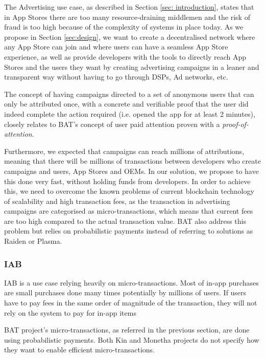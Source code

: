 The Advertising use case, as described in Section \ref{sec: introduction}, states that in App Stores there are too many resource-draining middlemen and the risk of fraud is too high because of the complexity of systems in place today. As we propose in Section \ref{sec:design}, we want to create a decentralised network where any App Store can join and where users can have a seamless App Store experience, as well as provide developers with the tools to directly reach App Stores and the users they want by creating advertising campaigns in a leaner and transparent way without having to go through DSPs, Ad networks, etc.

The concept of having campaigns directed to a set of anonymous users that can only be attributed once, with a concrete and verifiable proof that the user did indeed complete the action required (i.e. opened the app for at least 2 minutes), closely relates to BAT's concept of user paid attention proven with a \textit{proof-of-attention}.

Furthermore, we expected that campaigns can reach millions of attributions, meaning that there will be millions of transactions between developers who create campaigns and users, App Stores and OEMs. In our solution, we propose to have this done very fast, without holding funds from developers. In order to achieve this, we need to overcome the known problems of current blockchain technology of scalability and high transaction fees, as the transaction in advertising campaigns are categorised as micro-transactions, which means that current fees are too high compared to the actual transaction value. BAT also address this problem but relies on probabilistic payments \cite{MICROPAY1, MICROPAY2} instead of referring to solutions as Raiden or Plasma.

\subsubsection{IAB}

IAB is a use case relying heavily on micro-transactions. Most of in-app purchases are small purchases done many times potentially by millions of users. If users have to pay fees in the same order of magnitude of the transaction, they will not rely on the system to pay for in-app items

BAT project's micro-transactions, as referred in the previous section, are done using probabilistic payments. Both Kin and Monetha projects do not specify how they want to enable efficient micro-transactions.

